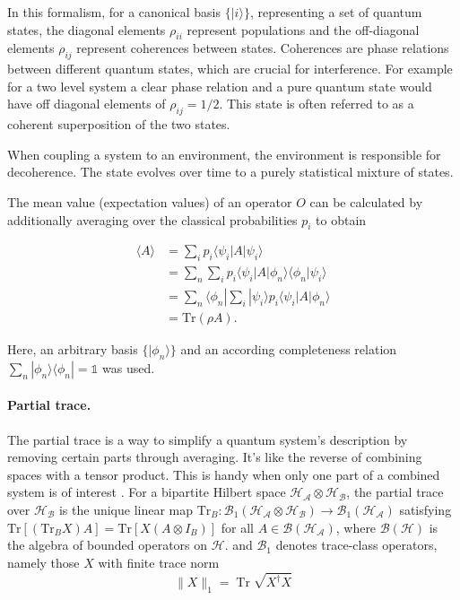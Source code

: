 \noindent
In this formalism, for a canonical basis $\{|i\rangle\}$, representing a set of quantum states, the diagonal elements $\rho_{ii} $ represent populations and the off-diagonal elements $\rho_{ij} $ represent coherences between states.
Coherences are phase relations between different quantum states, which are crucial for interference.
For example for a two level system a clear phase relation and a pure quantum state would have off diagonal elements of $ \rho_{ij} = 1/2$.
This state is often referred to as a coherent superposition of the two states.

When coupling a system to an environment, the environment is responsible for decoherence.
The state evolves over time to a purely statistical mixture of states.

The mean value (expectation values) of an operator $O$ can be calculated by additionally averaging over the classical probabilities $p_i$ to obtain

\begin{align}
\langle A \rangle &= \sum_i p_i \langle \psi_i | A | \psi_i \rangle \\
&= \sum_n \sum_i p_i \langle \psi_i | A | \phi_n \rangle \langle \phi_n | \psi_i \rangle \\
&= \sum_n \langle \phi_n | \sum_i |\psi_i\rangle p_i \langle \psi_i | A | \phi_n \rangle \\
&= \mathrm{Tr}(\rho A).
\end{align}

\noindent
Here, an arbitrary basis $\{|\phi_n\rangle\}$ and an according completeness relation $\sum_n |\phi_n\rangle \langle \phi_n| = \mathds{1}$ was used.


\paragraph{Partial trace.}

\noindent
The partial trace is a way to simplify a quantum system's description by removing certain parts through averaging. It's like the reverse of combining spaces with a tensor product. This is handy when only one part of a combined system is of interest \cite{lambertetal2024qutip5quantum}.
For a bipartite Hilbert space $\mathcal{H_A} \otimes \mathcal{H_B}$, the partial trace over $\mathcal{H_B}$ is the unique linear map $\mathrm{Tr}_B: \mathcal{B}_1(\mathcal{H_A} \otimes \mathcal{H_B}) \to \mathcal{B}_1(\mathcal{H_A})$ satisfying $\mathrm{Tr}[(\mathrm{Tr}_B X) A] = \mathrm{Tr}[X (A \otimes I_B)]$ for all $A \in \mathcal{B}(\mathcal{H_A})$, where  $\mathcal{B}(\mathcal{H})$ is the algebra of bounded operators on $\mathcal{H}$.
and $\mathcal{B}_1$ denotes trace-class operators, namely those $X$ with finite trace norm 
\[ 
  \| X \|_1 = \operatorname{Tr} \sqrt{X^\dagger X} 
\]

